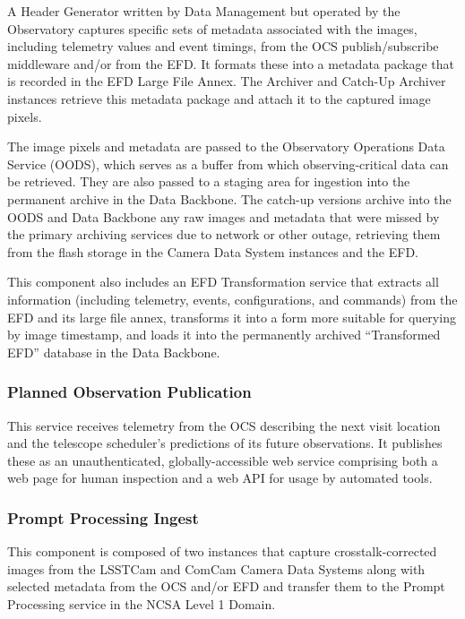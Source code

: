 \documentclass[DM,toc,lsstdraft]{lsstdoc}
\begin{document}
A Header Generator written by Data Management but operated by the Observatory captures specific sets of metadata
associated with the images, including telemetry values and event
timings, from the OCS publish/subscribe middleware and/or from the EFD.
It formats these into a metadata package that is recorded in the EFD Large File Annex.
The Archiver and Catch-Up Archiver instances retrieve this metadata package and attach it to the captured image pixels.

The image pixels and metadata are passed to the Observatory Operations Data Service (OODS), which serves as a buffer from which observing-critical data can be retrieved.
They are also passed to a staging area for ingestion into the permanent archive in the Data Backbone.
The catch-up versions archive into the OODS and Data Backbone any raw
images and metadata that were missed by the primary archiving services
due to network or other outage, retrieving them from the flash storage
in the Camera Data System instances and the EFD.

This component also includes an EFD Transformation service that extracts
all information (including telemetry, events, configurations, and
commands) from the EFD and its large file annex, transforms it into a
form more suitable for querying by image timestamp, and loads it into
the permanently archived ``Transformed EFD'' database in the Data
Backbone.

\subsubsection{Planned Observation Publication}\label{planned-observation-publication}

This service receives telemetry from the OCS describing the next visit location and the telescope scheduler's predictions of its future observations.
It publishes these as an unauthenticated, globally-accessible web service comprising both a web page for human inspection and a web API for usage by automated tools.

\subsubsection{Prompt Processing Ingest}\label{prompt-processing-ingest}

This component is composed of two instances that capture
crosstalk-corrected images from the LSSTCam and ComCam Camera Data
Systems along with selected metadata from the OCS and/or EFD and
transfer them to the Prompt Processing service in the NCSA Level
1 Domain.
\end{document}

